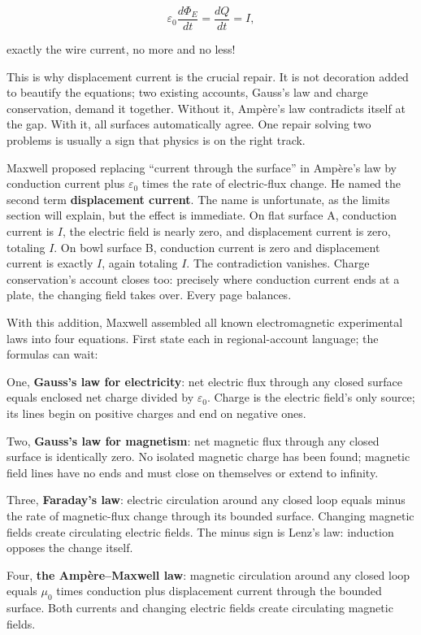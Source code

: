 \[
\varepsilon_0\frac{d\varPhi_E}{dt}=\frac{dQ}{dt}=I,
\]

exactly the wire current, no more and no less!

This is why displacement current is the crucial repair. It is not decoration added to beautify the equations; two existing accounts, Gauss's law and charge conservation, demand it together. Without it, Ampère's law contradicts itself at the gap. With it, all surfaces automatically agree. One repair solving two problems is usually a sign that physics is on the right track.

Maxwell proposed replacing ``current through the surface'' in Ampère's law by conduction current plus \(\varepsilon_0\) times the rate of electric-flux change. He named the second term \textbf{displacement current}. The name is unfortunate, as the limits section will explain, but the effect is immediate. On flat surface A, conduction current is \(I\), the electric field is nearly zero, and displacement current is zero, totaling \(I\). On bowl surface B, conduction current is zero and displacement current is exactly \(I\), again totaling \(I\). The contradiction vanishes. Charge conservation's account closes too: precisely where conduction current ends at a plate, the changing field takes over. Every page balances.

With this addition, Maxwell assembled all known electromagnetic experimental laws into four equations. First state each in regional-account language; the formulas can wait:

One, \textbf{Gauss's law for electricity}: net electric flux through any closed surface equals enclosed net charge divided by \(\varepsilon_0\). Charge is the electric field's only source; its lines begin on positive charges and end on negative ones.

Two, \textbf{Gauss's law for magnetism}: net magnetic flux through any closed surface is identically zero. No isolated magnetic charge has been found; magnetic field lines have no ends and must close on themselves or extend to infinity.

Three, \textbf{Faraday's law}: electric circulation around any closed loop equals minus the rate of magnetic-flux change through its bounded surface. Changing magnetic fields create circulating electric fields. The minus sign is Lenz's law: induction opposes the change itself.

Four, \textbf{the Ampère--Maxwell law}: magnetic circulation around any closed loop equals \(\mu_0\) times conduction plus displacement current through the bounded surface. Both currents and changing electric fields create circulating magnetic fields.

